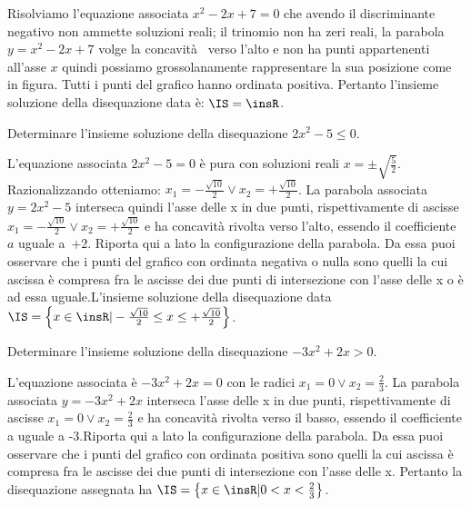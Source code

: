 \begin{esempio}
\begin{itemize}
Risolviamo l'equazione associata $x^2-2x+7=0$ che avendo il discriminante 
negativo non ammette soluzioni reali; il trinomio non ha zeri reali, la 
parabola 
$y=x^2-2x+7$ volge la concavità  verso l'alto e non ha punti appartenenti 
all'asse $x$ quindi possiamo grossolanamente rappresentare la sua posizione  
come in figura. Tutti i punti del grafico hanno ordinata positiva. Pertanto 
l'insieme soluzione della disequazione data è: $\IS=\insR$.
\end{itemize}
\begin{center}
 
\end{center}
\end{esempio}

% 
% 
% 

\begin{esempio}
Determinare l'insieme soluzione della disequazione $2x^2-5\le 0$.

L'equazione associata $2x^2-5=0$ è pura con soluzioni reali $x=\pm \sqrt{\frac 
5 2}$. Razionalizzando otteniamo: $x_1=-\frac{\sqrt{10}} 2\vee 
x_2=+\frac{\sqrt{10}} 2$. La parabola associata $y=2x^2-5$ interseca quindi 
l'asse delle x in due punti, rispettivamente di ascisse 
$x_1=-\frac{\sqrt{10}} 2\vee x_2=+\frac{\sqrt{10}} 2$ 
e ha concavità rivolta verso l'alto, essendo il coefficiente~$a$ uguale a~$+2$.
Riporta qui a lato la configurazione della parabola.
Da essa puoi osservare che i punti del grafico con ordinata negativa o nulla 
sono quelli la cui ascissa è compresa fra le ascisse dei due punti di 
intersezione con l'asse delle x o è ad essa uguale.L'insieme soluzione della 
disequazione data 
 $\IS=\left\{x\in \insR | -\frac{\sqrt{10}} 2\le x\le +\frac{\sqrt{10}} 
2\right\}$.
\end{esempio}


\begin{esempio}
Determinare l'insieme soluzione della disequazione $-3x^2+2x>0$.

L'equazione associata è $-3x^2+2x=0$ con le radici $x_1=0\vee x_2=\frac 2 3$. 
La parabola associata $y=-3x^2+2x$ interseca l'asse delle x in due punti, 
rispettivamente di ascisse $x_1=0\vee x_2=\frac 2 3$ e ha concavità rivolta 
verso il basso, essendo il coefficiente a uguale a -3.Riporta qui a lato la 
configurazione della parabola.
Da essa puoi osservare che i punti del grafico con ordinata positiva sono 
quelli 
la cui ascissa è compresa fra le ascisse dei due punti di intersezione con 
l'asse delle x.
Pertanto la disequazione assegnata ha $\IS=\left\{x\in \insR | 0<x<\frac 2 
3\right\}$.
\end{esempio}


